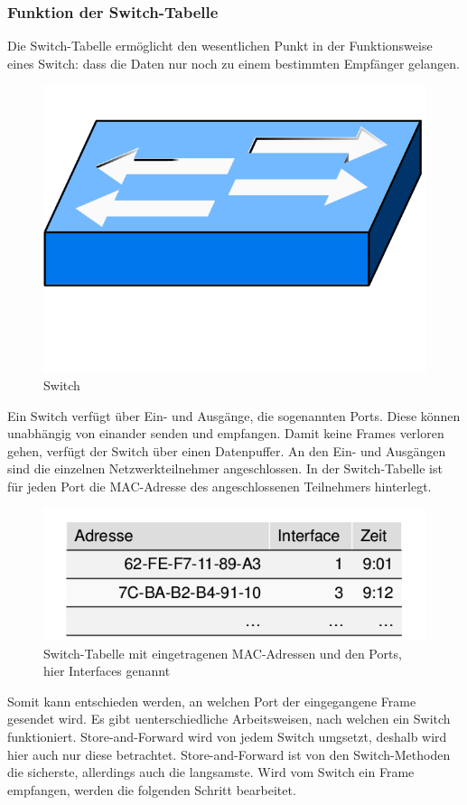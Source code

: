 \subsubsection{Funktion der Switch-Tabelle}
Die Switch-Tabelle ermöglicht den wesentlichen Punkt in der Funktionsweise eines Switch: dass die Daten nur noch zu einem bestimmten Empfänger gelangen.
\begin{figure}[H]
	\centering
	\includegraphics[width=0.3\linewidth]{images/switch.png}
	\caption{Switch \cite{switch-bild}}
\end{figure}
Ein Switch verfügt über Ein- und Ausgänge, die sogenannten Ports. Diese können unabhängig von einander senden und empfangen. Damit keine Frames verloren gehen, verfügt der Switch über einen Datenpuffer.
An den Ein- und Ausgängen sind die einzelnen Netzwerkteilnehmer angeschlossen. In der Switch-Tabelle ist für jeden Port die MAC-Adresse des angeschlossenen Teilnehmers hinterlegt.
\begin{figure}[H]
	\centering
	\includegraphics[width=0.7\linewidth]{images/switch-tabelle.png}
	\caption{Switch-Tabelle mit eingetragenen MAC-Adressen und den Ports, hier Interfaces genannt \cite[Kapitel 5, Abbildung Folie 39]{netzwerkeI}}
\end{figure}
Somit kann entschieden werden, an welchen Port der eingegangene Frame gesendet wird.
Es gibt uenterschiedliche Arbeitsweisen, nach welchen ein Switch funktioniert. Store-and-Forward wird von jedem Switch umgsetzt, deshalb wird hier auch nur diese betrachtet.
Store-and-Forward ist von den Switch-Methoden die sicherste, allerdings auch die langsamste.
Wird vom Switch ein Frame empfangen, werden die folgenden Schritt bearbeitet.

